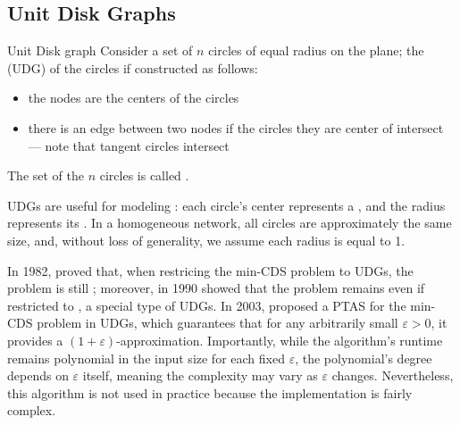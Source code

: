 \documentclass[a4paper, 12pt]{report}
\begin{document}

    \subsection{Unit Disk Graphs}

    \begin{frameddefn}{Unit Disk graph}
        Consider a set of $n$ circles of equal radius on the plane; the  (UDG) of the circles if constructed as follows:

        \begin{itemize}
            \item the nodes are the centers of the circles
            \item there is an edge between two nodes if the circles they are center of intersect --- note that tangent circles intersect
        \end{itemize}

        The set of the $n$ circles is called .
    \end{frameddefn}

    UDGs are useful for modeling : each circle's center represents a , and the radius represents its . In a homogeneous network, all circles are approximately the same size, and, without loss of generality, we assume each radius is equal to 1.

    In 1982, \textcite{lichtenstein} proved that, when restricing the min-CDS problem to UDGs, the problem is still \NPHard; moreover, in 1990 \textcite{clark} showed that the problem remains \NPHard even if restricted to , a special type of UDGs. In 2003, \textcite{cheng} proposed a PTAS for the min-CDS problem in UDGs, which guarantees that for any arbitrarily small $\varepsilon > 0$, it provides a $(1 + \varepsilon)$-approximation. Importantly, while the algorithm's runtime remains polynomial in the input size for each fixed $\varepsilon$, the polynomial's degree depends on $\varepsilon$ itself, meaning the complexity may vary as $\varepsilon$ changes. Nevertheless, this algorithm is not used in practice because the implementation is fairly complex.
\end{document}
